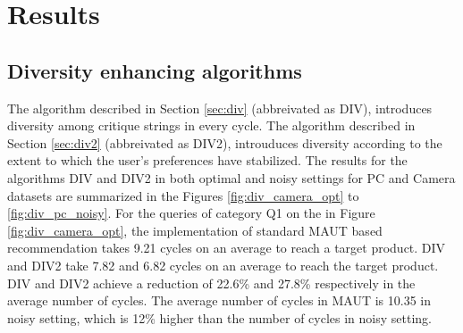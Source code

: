 \section{Results}
\subsection{Diversity enhancing algorithms}
\label{sec:div_results}
The algorithm described in Section \ref{sec:div} (abbreivated as DIV), introduces diversity among critique strings in every cycle. 
The algorithm described in Section \ref{sec:div2} (abbreivated as DIV2), introuduces diversity according to the extent to which the user's preferences have stabilized.
The results for the algorithms DIV and DIV2 in both optimal and noisy settings for PC and Camera datasets are summarized in the Figures \ref{fig:div_camera_opt} to \ref{fig:div_pc_noisy}.
For the queries of category Q1 on the in Figure \ref{fig:div_camera_opt}, the implementation of standard MAUT based recommendation takes 9.21 cycles on an average to reach a target product.
DIV and DIV2 take 7.82 and 6.82 cycles on an average to reach the target product.
DIV and DIV2 achieve a reduction of 22.6\% and 27.8\% respectively in the average number of cycles.
The average number of cycles in MAUT is 10.35 in noisy setting, which is 12\% higher than the number of cycles in noisy setting.



